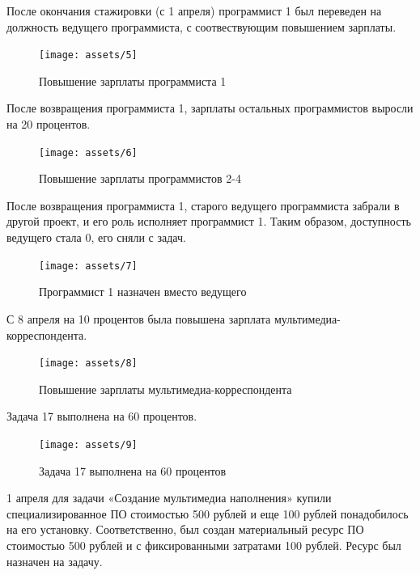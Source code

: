 После окончания стажировки (с 1 апреля) программист 1 был переведен на должность ведущего программиста, с соотвествующим повышением зарплаты.

\begin{figure}[H]
    \begin{center}
    \texttt{[image: assets/5]}
    \caption{Повышение зарплаты программиста 1}
    \label{fig:5}
    \end{center}
\end{figure}

После возвращения программиста 1, зарплаты остальных программистов выросли на 20 процентов.

\begin{figure}[H]
    \begin{center}
    \texttt{[image: assets/6]}
    \caption{Повышение зарплаты программистов 2-4}
    \label{fig:6}
    \end{center}
\end{figure}

После возвращения программиста 1, старого ведущего программиста забрали в другой проект, и его роль исполняет программист 1. Таким образом, доступность ведущего стала 0, его сняли с задач.

\begin{figure}[H]
    \begin{center}
    \texttt{[image: assets/7]}
    \caption{Программист 1 назначен вместо ведущего}
    \label{fig:7}
    \end{center}
\end{figure}

С 8 апреля на 10 процентов была повышена зарплата мультимедиа-корреспондента.

\begin{figure}[H]
    \begin{center}
    \texttt{[image: assets/8]}
    \caption{Повышение зарплаты мультимедиа-корреспондента}
    \label{fig:8}
    \end{center}
\end{figure}

Задача 17 выполнена на 60 процентов.

\begin{figure}[H]
    \begin{center}
    \texttt{[image: assets/9]}
    \caption{Задача 17 выполнена на 60 процентов}
    \label{fig:9}
    \end{center}
\end{figure}

1 апреля для задачи «Создание мультимедиа наполнения» купили специализированное ПО стоимостью 500 рублей и еще 100 рублей понадобилось на его установку. Соответственно, был создан материальный ресурс ПО стоимостью 500 рублей и с фиксированными затратами 100 рублей. Ресурс был назначен на задачу.

